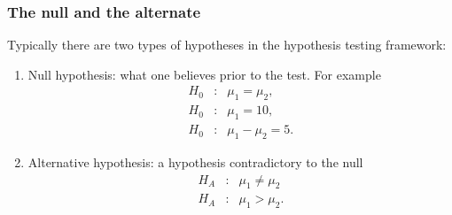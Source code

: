 \begin{frame}[fragile]\frametitle{The null and the alternate}

Typically there are two types of hypotheses in
the hypothesis testing framework: 
\begin{enumerate}
\item Null hypothesis: what one believes prior to the test. For
example
\begin{eqnarray*}
H_0&:& \mu_1 = \mu_2,\\
H_0&:& \mu_1 = 10,\\
H_0&:& \mu_1 - \mu_2=5.
\end{eqnarray*}

\item Alternative hypothesis: a hypothesis contradictory to
the null
\begin{eqnarray*}
H_A&:& \mu_1 \neq \mu_2 \\
H_A&:& \mu_1 > \mu_2.
\end{eqnarray*}
\end{enumerate}

\end{frame}


